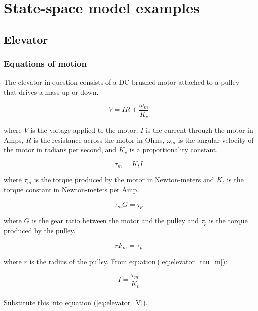\section{State-space model examples}

\subsection{Elevator}

\subsubsection{Equations of motion}

The elevator in question consists of a DC brushed motor attached to a pulley
that drives a mass up or down.

\begin{equation}
  V = IR + \frac{\omega_m}{K_v} \label{eq:elevator_V}
\end{equation}

where $V$ is the voltage applied to the motor, $I$ is the current through the
motor in Amps, $R$ is the resistance across the motor in Ohms, $\omega_m$ is the
angular velocity of the motor in radians per second, and $K_v$ is a
proportionality constant.

\begin{equation}
  \tau_m = K_t I \label{eq:elevator_tau_m}
\end{equation}

where $\tau_m$ is the torque produced by the motor in Newton-meters and $K_t$ is
the torque constant in Newton-meters per Amp.

\begin{equation}
  \tau_m G = \tau_p \label{eq:elevator_tau_m_ratio}
\end{equation}

where $G$ is the gear ratio between the motor and the pulley and $\tau_p$ is the
torque produced by the pulley.

\begin{equation}
  rF_m = \tau_p \label{eq:elevator_torque_pulley}
\end{equation}

where $r$ is the radius of the pulley. From equation (\ref{eq:elevator_tau_m}):

\begin{equation}
  I = \frac{\tau_m}{K_t}
\end{equation}
\\
Substitute this into equation (\ref{eq:elevator_V}).

